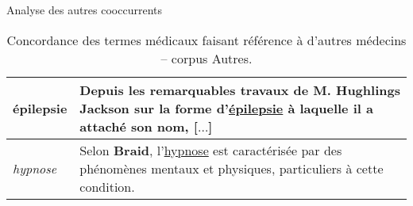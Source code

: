 \begin{frame}{Analyse des autres cooccurrents}
\begin{table}
{\begin{tabular}{|l|p{10cm}|}
				épilepsie & Depuis les remarquables travaux de M. Hughlings \textbf{Jackson} sur la forme d'\underline{épilepsie} à laquelle il a attaché son nom, [$\dots$] \\ \hline
				\textit{hypnose} & Selon \textbf{Braid}, l'\underline{hypnose} est caractérisée par des phénomènes mentaux et physiques, particuliers à cette condition.\\
				\hline
			\end{tabular}
		}
		\caption{Concordance des termes médicaux faisant référence à d'autres médecins -- corpus Autres.}
	\end{table}
\end{frame}

%	
%	
%	
%	
%	

